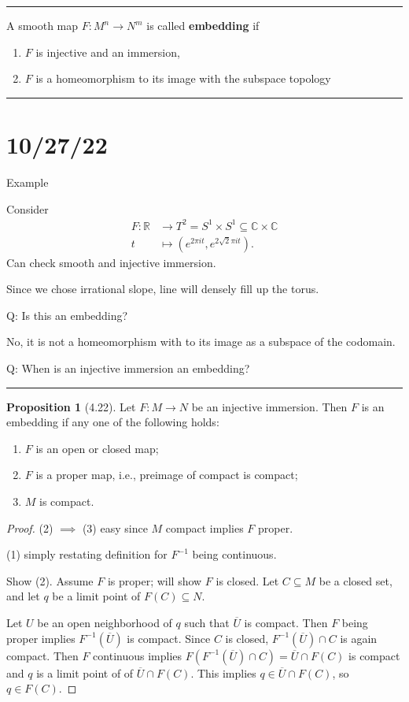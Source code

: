 \documentclass[12pt]{article}
\newcommand{\keyword}[1]{\textbf{#1}}
\newcommand{\sepline}{\rule{\textwidth}{0.4pt}}
\theoremstyle{definition}
\newtheorem{proposition}{Proposition}
\newcommand{\R}{\mathbb{R}}
\newcommand{\C}{\mathbb{C}}
\newcommand{\<}{\left\langle}
\renewcommand{\>}{\right\rangle}
\newcommand{\seq}{\subseteq}
\newcommand{\To}{\longrightarrow}
\newcommand{\Mapsto}{\longmapsto}
\newcommand{\clo}{\overline}
\begin{document}
\sepline

A smooth map $F : M^n \to N^m$ is called \keyword{embedding} if
\begin{enumerate}[(1)]
    \item $F$ is injective and an immersion,
    \item $F$ is a homeomorphism to its image with the subspace topology
\end{enumerate}

\sepline

\section*{10/27/22}

Example

Consider
\begin{align*}
    F: \R &\To T^2 = S^1 \times S^1 \seq \C \times \C \\
        t &\Mapsto (e^{2\pi it}, e^{2\sqrt{2}\pi it}).
\end{align*}
Can check smooth and injective immersion.

Since we chose irrational slope, line will densely fill up the torus.

Q: Is this an embedding?

No, it is not a homeomorphism with to its image as a subspace of the codomain.

Q: When is an injective immersion an embedding?

\sepline

\begin{proposition}[4.22]
    Let $F : M \to N$ be an injective immersion.
    Then $F$ is an embedding if any one of the following holds:
    \begin{enumerate}[(1)]
        \item $F$ is an open or closed map;
        \item $F$ is a proper map, i.e., preimage of compact is compact;
        \item $M$ is compact.
    \end{enumerate}
\end{proposition}

\begin{proof}
    (2) $\implies$ (3) easy since $M$ compact implies $F$ proper.

    (1) simply restating definition for $F^{-1}$ being continuous.

    Show (2).
    Assume $F$ is proper; will show $F$ is closed.
    Let $C \seq M$ be a closed set, and let $q$ be a limit point of $F(C) \seq N$.

    Let $U$ be an open neighborhood of $q$ such that $\clo{U}$ is compact.
    Then $F$ being proper implies $F^{-1}(\clo{U})$ is compact.
    Since $C$ is closed, $F^{-1}(\clo{U}) \cap C$ is again compact.
    Then $F$ continuous implies $F(F^{-1}(\clo{U}) \cap C) = \clo{U} \cap F(C)$ is compact and $q$ is a limit point of of $\clo{U} \cap F(C)$.
    This implies $q \in \clo{U} \cap F(C)$, so $q \in F(C)$.
\end{proof}
\end{document}
